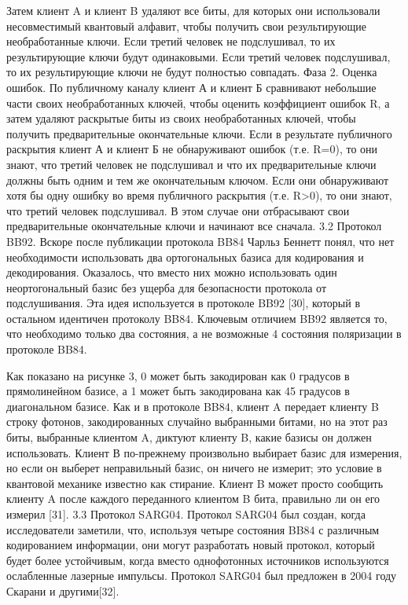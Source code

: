 Затем клиент A и клиент B удаляют все биты, для которых они использовали несовместимый квантовый алфавит, чтобы получить свои результирующие необработанные ключи. Если третий человек не подслушивал, то их результирующие ключи будут одинаковыми. Если третий человек подслушивал, то их результирующие ключи не будут полностью совпадать.
Фаза 2. Оценка ошибок. По публичному каналу клиент А и клиент Б сравнивают небольшие части своих необработанных ключей, чтобы оценить коэффициент ошибок R, а затем удаляют раскрытые биты из своих необработанных ключей, чтобы получить предварительные окончательные ключи. Если в результате публичного раскрытия клиент А и клиент Б не обнаруживают ошибок (т.е. R=0), то они знают, что третий человек не подслушивал и что их предварительные ключи должны быть одним и тем же окончательным ключом. Если они обнаруживают хотя бы одну ошибку во время публичного раскрытия (т.е. R>0), то они знают, что третий человек подслушивал. В этом случае они отбрасывают свои предварительные окончательные ключи и начинают все сначала.
3.2 Протокол BB92. Вскоре после публикации протокола BB84 Чарльз Беннетт понял, что нет необходимости использовать два ортогональных базиса для кодирования и декодирования. Оказалось, что вместо них можно использовать один неортогональный базис без ущерба для безопасности протокола от подслушивания. Эта идея используется в протоколе BB92 [30], который в остальном идентичен протоколу BB84.
Ключевым отличием BB92 является то, что необходимо только два состояния, а не возможные 4 состояния поляризации в протоколе BB84.

Как показано на рисунке 3, 0 может быть закодирован как 0 градусов в прямолинейном базисе, а 1 может быть закодирована как 45 градусов в диагональном базисе. Как и в протоколе BB84, клиент A передает клиенту B строку фотонов, закодированных случайно выбранными битами, но на этот раз биты, выбранные клиентом A, диктуют клиенту B, какие базисы он должен использовать. Клиент В по-прежнему произвольно выбирает базис для измерения, но если он выберет неправильный базис, он ничего не измерит; это условие в квантовой механике известно как стирание. Клиент B может просто сообщить клиенту A после каждого переданного клиентом B бита, правильно ли он его измерил [31].
3.3 Протокол SARG04. Протокол SARG04 был создан, когда исследователи заметили, что, используя четыре состояния BB84 с различным кодированием информации, они могут разработать новый протокол, который будет более устойчивым, когда вместо однофотонных источников используются ослабленные лазерные импульсы. Протокол SARG04 был предложен в 2004 году Скарани и другими[32].

